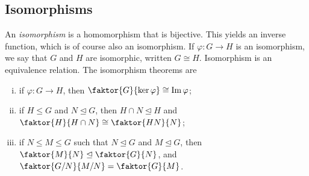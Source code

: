 \subsection{Isomorphisms}
An \textit{isomorphism} is a homomorphism that is bijective.
This yields an inverse function, which is of course also an isomorphism.
If \( \varphi \colon G \to H \) is an isomorphism, we say that \( G \) and \( H \) are isomorphic, written \( G \cong H \).
Isomorphism is an equivalence relation.
The isomorphism theorems are
\begin{enumerate}[(i)]
	\item if \( \varphi \colon G \to H \), then \( \faktor{G}{\ker \varphi} \cong \Im \varphi \);
	\item if \( H \leq G \) and \( N \trianglelefteq G \), then \( H \cap N \trianglelefteq H \) and \( \faktor{H}{H \cap N} \cong \faktor{HN}{N} \);
	\item if \( N \leq M \leq G \) such that \( N \trianglelefteq G \) and \( M \trianglelefteq G \), then \( \faktor{M}{N} \trianglelefteq \faktor{G}{N} \), and \( \faktor{G/N}{M/N} = \faktor{G}{M} \).
\end{enumerate}
